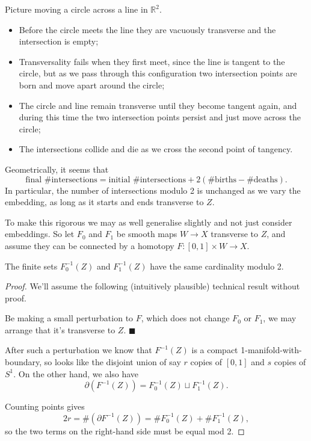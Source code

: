 \documentclass[a4paper,11pt]{article}
\begin{document}
	\begin{ex}
		Picture moving a circle across a line in $\mathbb{R}^2$.


		\begin{itemize}
			\item Before the circle meets the line they are vacuously transverse and the intersection is empty;
			\item Transversality fails when they first meet, since the line is tangent to the circle, but as we pass through this configuration two intersection points are born and move apart around the circle;
			\item The circle and line remain transverse until they become tangent again, and during this time the two intersection points persist and just move across the circle;
			\item The intersections collide and die as we cross the second point of tangency.
		\end{itemize}
	\end{ex}

	Geometrically, it seems that
	\[
		\text{final \#intersections} = \text{initial \#intersections} + 2(\text{\#births} - \text{\#deaths}).
	\]
	In particular, the number of intersections modulo 2 is unchanged as we vary the embedding, as long as it starts and ends transverse to $Z$.
	
	To make this rigorous we may as well generalise slightly and not just consider embeddings. So let $F_0$ and $F_1$ be smooth maps $W \to X$ transverse to $Z$, and assume they can be connected by a homotopy $F: [0,1]\times W \to X$.

	\begin{thm}
		The finite sets $F_0^{-1}(Z)$ and $F_1^{-1}(Z)$ have the same cardinality modulo 2.
		\label{thm:1.134}
	\end{thm}

	\begin{proof}
		We'll assume the following (intuitively plausible) technical result without proof.

		\begin{lem}
			Be making a small perturbation to $F$, which does not change $F_0$ or $F_1$, we may arrange that it's transverse to $Z$. \hfill $\blacksquare$ 
		\end{lem}

		After such a perturbation we know that $F^{-1}(Z)$ is a compact 1-manifold-with-boundary, so looks like the disjoint union of say $r$ copies of $[0,1]$ and $s$ copies of $S^1$. On the other hand, we also have
		\[
			\partial(F^{-1}(Z)) = F_0^{-1}(Z) \sqcup F_1^{-1}(Z).
		\]

		Counting points gives
		\[
			2r = \#(\partial F^{-1}(Z)) = \#F_0^{-1}(Z) + \#F_1^{-1}(Z),
		\]
		so the two terms on the right-hand side must be equal mod 2.
	\end{proof}
\end{document}

